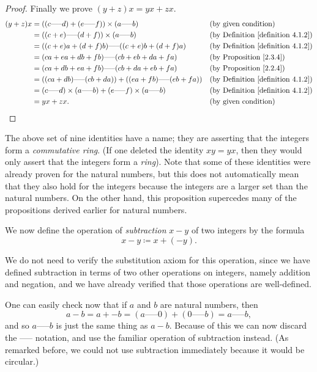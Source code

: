 \begin{proof}
Finally we prove \((y + z)x = yx + zx\).
\begin{align*}
(y + z)x &= ((c \text{-----} d) + (e \text{-----} f)) \times (a \text{-----} b) && \text{(by given condition)} \\
&= ((c + e) \text{-----} (d + f)) \times (a \text{-----} b) && \text{(by Definition \ref{definition 4.1.2})} \\
&= ((c + e)a + (d + f)b) \text{-----} ((c + e)b + (d + f)a) && \text{(by Definition \ref{definition 4.1.2})} \\
&= (ca + ea + db + fb) \text{-----} (cb + eb + da + fa) && \text{(by Proposition \ref{2.3.4})} \\
&= (ca + db + ea + fb) \text{-----} (cb + da + eb + fa) && \text{(by Proposition \ref{2.2.4})} \\
&= ((ca + db) \text{-----} (cb + da)) + ((ea + fb) \text{-----} (eb + fa)) && \text{(by Definition \ref{definition 4.1.2})} \\
&= (c \text{-----} d) \times (a \text{-----} b) + (e \text{-----} f) \times (a \text{-----} b) && \text{(by Definition \ref{definition 4.1.2})} \\
&= yx + zx. && \text{(by given condition)}
\end{align*}
\end{proof}

\begin{remark}
The above set of nine identities have a name; they are asserting that the integers form a \emph{commutative ring}.
(If one deleted the identity \(xy = yx\), then they would only assert that the integers form a \emph{ring}).
Note that some of these identities were already proven for the natural numbers, but this does not automatically mean that they also hold for the integers because the integers are a larger set than the natural numbers.
On the other hand, this proposition supercedes many of the propositions derived earlier for natural numbers.
\end{remark}

We now define the operation of \emph{subtraction} \(x - y\) of two integers by the formula
\[
    x - y \coloneqq x + (-y).
\]

We do not need to verify the substitution axiom for this operation, since we have defined subtraction in terms of two other operations on integers, namely addition and negation, and we have already verified that those operations are well-defined.

One can easily check now that if \(a\) and \(b\) are natural numbers, then
\[
    a - b = a + -b = (a \text{-----} 0) + (0 \text{-----} b) = a \text{-----} b,
\]
and so \(a \text{-----} b\) is just the same thing as \(a - b\).
Because of this we can now discard the ----- notation, and use the familiar operation of subtraction instead.
(As remarked before, we could not use subtraction immediately because it would be circular.)

